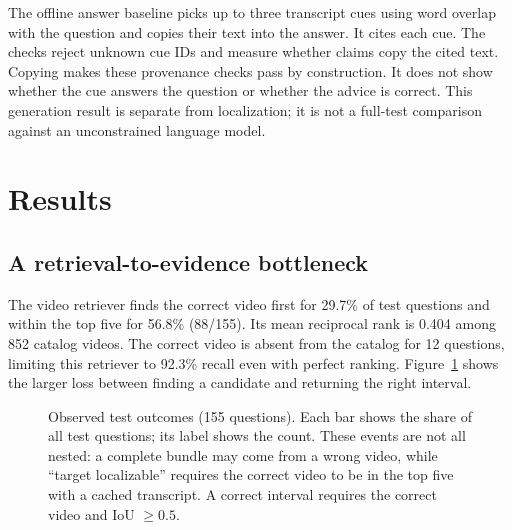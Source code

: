 \documentclass[sigconf,authorversion,nonacm]{acmart}
\begin{document}
The offline answer baseline picks up to three transcript cues using word overlap with the question and copies their text into the answer. It cites each cue. The checks reject unknown cue IDs and measure whether claims copy the cited text. Copying makes these provenance checks pass by construction. It does not show whether the cue answers the question or whether the advice is correct. This generation result is separate from localization; it is not a full-test comparison against an unconstrained language model.

\section{Results}
\subsection{A retrieval-to-evidence bottleneck}
The video retriever finds the correct video first for 29.7\% of test questions and within the top five for 56.8\% (88/155). Its mean reciprocal rank is 0.404 among 852 catalog videos. The correct video is absent from the catalog for 12 questions, limiting this retriever to 92.3\% recall even with perfect ranking. Figure~\ref{fig:outcomes} shows the larger loss between finding a candidate and returning the right interval.

\begin{figure}[t]
\centering
{}
\caption{Observed test outcomes (155 questions). Each bar shows the share of all test questions; its label shows the count. These events are not all nested: a complete bundle may come from a wrong video, while ``target localizable'' requires the correct video to be in the top five with a cached transcript. A correct interval requires the correct video and IoU $\geq0.5$.}
\label{fig:outcomes}
\end{figure}
\end{document}
